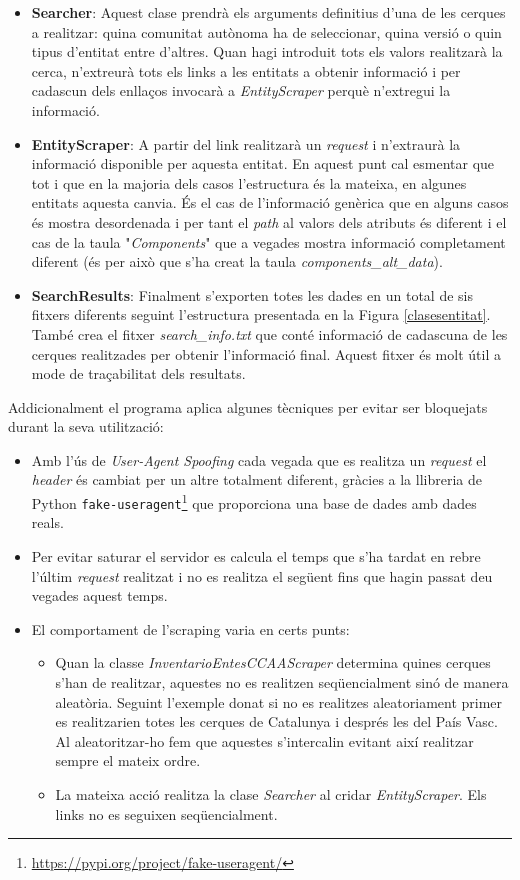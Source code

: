 \documentclass[12pt]{article}
\begin{document}
\begin{itemize}
    \item \textbf{Searcher}: Aquest clase prendrà els arguments definitius d'una de les cerques a realitzar: quina comunitat autònoma ha de seleccionar, quina versió o quin tipus d'entitat entre d'altres. Quan hagi introduit tots els valors realitzarà la cerca, n'extreurà tots els links a les entitats a obtenir informació i per cadascun dels enllaços invocarà a \textit{EntityScraper} perquè n'extregui la informació.
    \item \textbf{EntityScraper}: A partir del link realitzarà un \textit{request} i n'extraurà la informació disponible per aquesta entitat. En aquest punt cal esmentar que tot i que en la majoria dels casos l'estructura és la mateixa, en algunes entitats aquesta canvia. És el cas de l'informació genèrica que en alguns casos és mostra desordenada i per tant el \textit{path} al valors dels atributs és diferent i el cas de la taula "\textit{Components}" que a vegades mostra informació completament diferent (és per això que s'ha creat la taula \textit{components\_alt\_data}).
    \item \textbf{SearchResults}: Finalment s'exporten totes les dades en un total de sis fitxers diferents seguint l'estructura presentada en la Figura \ref{clasesentitat}. També crea el fitxer \textit{search\_info.txt} que conté informació de cadascuna de les cerques realitzades per obtenir l'informació final. Aquest fitxer és molt útil a mode de traçabilitat dels resultats.
\end{itemize}


Addicionalment el programa aplica algunes tècniques per evitar ser bloquejats durant la seva utilització:
\begin{itemize}
    \item Amb l'ús de \textit{User-Agent Spoofing} cada vegada que es realitza un \textit{request} el \textit{header} és cambiat per un altre totalment diferent, gràcies a la llibreria de Python \texttt{fake-useragent}\footnote{\url{https://pypi.org/project/fake-useragent/}} que proporciona una base de dades amb dades reals. 
    \item Per evitar saturar el servidor es calcula el temps que s'ha tardat en rebre l'últim \textit{request} realitzat i no es realitza el següent fins que hagin passat deu vegades aquest temps.
    \item El comportament de l'scraping varia en certs punts:
    \begin{itemize}
        \item Quan la classe \textit{InventarioEntesCCAAScraper} determina quines cerques s'han de realitzar, aquestes no es realitzen seqüencialment sinó de manera aleatòria. Seguint l'exemple donat si no es realitzes aleatoriament primer es realitzarien totes les cerques de Catalunya i després les del País Vasc. Al aleatoritzar-ho fem que aquestes s'intercalin evitant així realitzar sempre el mateix ordre.
        \item La mateixa acció realitza la clase \textit{Searcher} al cridar \textit{EntityScraper}. Els links no es seguixen seqüencialment.
    \end{itemize}
\end{itemize}
\end{document}

